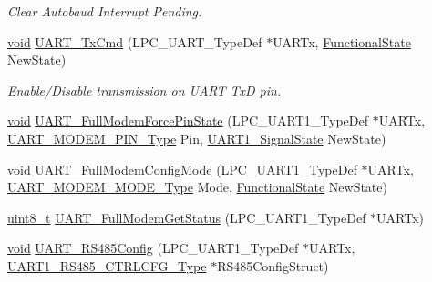 \begin{DoxyCompactItemize}
\begin{DoxyCompactList}\small\item\em Clear Autobaud Interrupt Pending. \end{DoxyCompactList}\item 
\hyperlink{usb__devapi_8h_afabf60e7f57651d6d595a02c75f07cd0}{void} \hyperlink{group___u_a_r_t___public___functions_ga3400356ef61d3735d9d10e04e0e95df4}{U\+A\+R\+T\+\_\+\+Tx\+Cmd} (L\+P\+C\+\_\+\+U\+A\+R\+T\+\_\+\+Type\+Def $\ast$U\+A\+R\+Tx, \hyperlink{agilefox_2library_2inc_2stm32f10x__type_8h_ac9a7e9a35d2513ec15c3b537aaa4fba1}{Functional\+State} New\+State)
\begin{DoxyCompactList}\small\item\em Enable/\+Disable transmission on U\+A\+RT TxD pin. \end{DoxyCompactList}\item 
\hyperlink{usb__devapi_8h_afabf60e7f57651d6d595a02c75f07cd0}{void} \hyperlink{group___u_a_r_t___public___functions_ga5a21807b2f967d1ed1de7bd468cbd9ad}{U\+A\+R\+T\+\_\+\+Full\+Modem\+Force\+Pin\+State} (L\+P\+C\+\_\+\+U\+A\+R\+T1\+\_\+\+Type\+Def $\ast$U\+A\+R\+Tx, \hyperlink{group___u_a_r_t___public___types_gabfc7ec239b7d598e6a2cc163e66b76fc}{U\+A\+R\+T\+\_\+\+M\+O\+D\+E\+M\+\_\+\+P\+I\+N\+\_\+\+Type} Pin, \hyperlink{group___u_a_r_t___public___types_gada493f726a4ea247b209b49fb8c85a52}{U\+A\+R\+T1\+\_\+\+Signal\+State} New\+State)
\item 
\hyperlink{usb__devapi_8h_afabf60e7f57651d6d595a02c75f07cd0}{void} \hyperlink{group___u_a_r_t___public___functions_gad65d361221a648575a5328ec1a243aa9}{U\+A\+R\+T\+\_\+\+Full\+Modem\+Config\+Mode} (L\+P\+C\+\_\+\+U\+A\+R\+T1\+\_\+\+Type\+Def $\ast$U\+A\+R\+Tx, \hyperlink{group___u_a_r_t___public___types_ga55fc73bec4c58ad15d24b05095c4523a}{U\+A\+R\+T\+\_\+\+M\+O\+D\+E\+M\+\_\+\+M\+O\+D\+E\+\_\+\+Type} Mode, \hyperlink{agilefox_2library_2inc_2stm32f10x__type_8h_ac9a7e9a35d2513ec15c3b537aaa4fba1}{Functional\+State} New\+State)
\item 
\hyperlink{_p_e___types_8h_aba7bc1797add20fe3efdf37ced1182c5}{uint8\+\_\+t} \hyperlink{group___u_a_r_t___public___functions_gaee50c6ea6e2ccfa7cc6edceee5833d1e}{U\+A\+R\+T\+\_\+\+Full\+Modem\+Get\+Status} (L\+P\+C\+\_\+\+U\+A\+R\+T1\+\_\+\+Type\+Def $\ast$U\+A\+R\+Tx)
\item 
\hyperlink{usb__devapi_8h_afabf60e7f57651d6d595a02c75f07cd0}{void} \hyperlink{group___u_a_r_t___public___functions_ga61acf8ebde89ef2b8c05c2d2a9ac9e7c}{U\+A\+R\+T\+\_\+\+R\+S485\+Config} (L\+P\+C\+\_\+\+U\+A\+R\+T1\+\_\+\+Type\+Def $\ast$U\+A\+R\+Tx, \hyperlink{struct_u_a_r_t1___r_s485___c_t_r_l_c_f_g___type}{U\+A\+R\+T1\+\_\+\+R\+S485\+\_\+\+C\+T\+R\+L\+C\+F\+G\+\_\+\+Type} $\ast$R\+S485\+Config\+Struct)

\end{DoxyCompactItemize}
